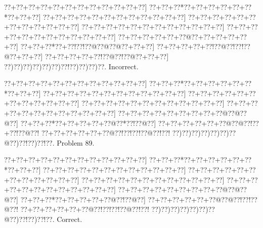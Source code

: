 \documentclass[a5paper]{article}
\begin{document}
\begin{center}
{\goo
\0??+\0??+\0??+\0??+\0??+\0??+\0??+\0??+\0??+\0??+\0??+\0??]
\0??+\0??+\0??*\0??+\0??+\0??+\0??+\0??+\0??*\0??+\0??+\0??]
\0??+\0??+\0??+\0??+\0??+\0??+\0??+\0??+\0??+\0??+\0??+\0??]
\0??+\0??+\0??+\0??+\0??+\0??+\0??+\0??+\0??+\0??+\0??+\0??]
\0??+\0??+\0??+\0??+\0??+\0??+\0??+\0??+\0??+\0??+\0??+\0??]
\0??+\0??+\0??+\0??+\0??+\0??+\0??+\0??+\0??+\0??+\0??+\0??]
\0??+\0??+\0??+\0??+\0??+\0??@\0??+\0??+\0??+\0??+\0??+\0??]
\0??+\0??+\0??*\0??+\0??!\0??!\0??@\0??@\0??@\0??+\0??+\0??]
\0??+\0??+\0??+\0??+\0??!\0??@\0??!\0??!\0??@\0??+\0??+\0??]
\0??+\0??+\0??+\0??+\0??!\0??@\0??!\0??@\0??+\0??+\0??]
\0??)\0??)\0??)\0??)\0??)\0??)\0??!\0??)\0??)\0??)\0??.
}
Incorrect. 

\end{center}
\newpage
\begin{center}
{\goo
\0??+\0??+\0??+\0??+\0??+\0??+\0??+\0??+\0??+\0??+\0??+\0??]
\0??+\0??+\0??*\0??+\0??+\0??+\0??+\0??+\0??*\0??+\0??+\0??]
\0??+\0??+\0??+\0??+\0??+\0??+\0??+\0??+\0??+\0??+\0??+\0??]
\0??+\0??+\0??+\0??+\0??+\0??+\0??+\0??+\0??+\0??+\0??+\0??]
\0??+\0??+\0??+\0??+\0??+\0??+\0??+\0??+\0??+\0??+\0??+\0??]
\0??+\0??+\0??+\0??+\0??+\0??+\0??+\0??+\0??+\0??+\0??+\0??]
\0??+\0??+\0??+\0??+\0??+\0??+\0??+\0??+\0??@\0??@\0??@\0??]
\0??+\0??+\0??*\0??+\0??+\0??+\0??+\0??@\0??*\0??!\0??@\0??]
\0??+\0??+\0??+\0??+\0??+\0??@\0??@\0??!\0??+\0??!\0??@\0??!
\0??+\0??+\0??+\0??+\0??+\0??@\0??!\0??!\0??!\0??@\0??!\0??!
\0??)\0??)\0??)\0??)\0??)\0??)\0??@\0??)\0??!\0??)\0??!\0??.
}
Problem 89.

\end{center}
\begin{center}
{\goo
\0??+\0??+\0??+\0??+\0??+\0??+\0??+\0??+\0??+\0??+\0??+\0??]
\0??+\0??+\0??*\0??+\0??+\0??+\0??+\0??+\0??*\0??+\0??+\0??]
\0??+\0??+\0??+\0??+\0??+\0??+\0??+\0??+\0??+\0??+\0??+\0??]
\0??+\0??+\0??+\0??+\0??+\0??+\0??+\0??+\0??+\0??+\0??+\0??]
\0??+\0??+\0??+\0??+\0??+\0??+\0??+\0??+\0??+\0??+\0??+\0??]
\0??+\0??+\0??+\0??+\0??+\0??+\0??+\0??+\0??+\0??+\0??+\0??]
\0??+\0??+\0??+\0??+\0??+\0??+\0??+\0??+\0??@\0??@\0??@\0??]
\0??+\0??+\0??*\0??+\0??+\0??+\0??+\0??@\0??!\0??@\0??]
\0??+\0??+\0??+\0??+\0??+\0??@\0??@\0??!\0??!\0??@\0??!
\0??+\0??+\0??+\0??+\0??+\0??@\0??!\0??!\0??!\0??@\0??!\0??!
\0??)\0??)\0??)\0??)\0??)\0??)\0??@\0??)\0??!\0??)\0??!\0??.
}
Correct. 

\end{center}
\end{document}
